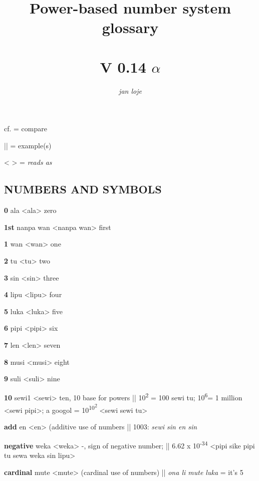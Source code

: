 \documentclass{article}
\title{Power-based number system glossary \\[1ex]{\HHUGE{\tpf lipu-nimi pi nasin nanpa sewi1}} \\ V 0.14 $\alpha$}
\author{\textit{jan loje}}
\begin{document}
\maketitle

\newcommand\tpDef[4]{\textbf{#1} {\Large\tpf #2} <\textsf{#3}> #4}

\newcommand\tpDefB[3]{\textbf{#1} {\Large\tpf #2} \textit{#3}}

\setlength{\parskip}{0.3em}

cf. = compare

|| = example(s)

< > = \textit{reads as}



\begin{multicols}{2}
\raggedright
\begin{hangparas}{1cm}{1}

\section*{NUMBERS AND SYMBOLS}

\tpDef {0}{ala}{ala}{zero}

\tpDef {1st}{nanpa wan}{nanpa wan}{first}

\tpDef {1}{wan}{wan}{one}

\tpDef {2}{tu}{tu}{two}

\tpDef {3}{sin}{sin}{three}

\tpDef {4}{lipu}{lipu}{four}

\tpDef {5}{luka}{luka}{five}

\tpDef {6}{pipi}{pipi}{six}

\tpDef {7}{len}{len}{seven}

\tpDef {8}{musi}{musi}{eight}

\tpDef {9}{suli}{suli}{nine}

\tpDef {10}{sewi1}{sewi}{ten, 10 base for powers || 10\textsuperscript{2} = 100 \textsf{sewi tu};  10\textsuperscript{6}= 1 million \textsf{<sewi pipi>}; a googol = 10\textsuperscript{10\textsuperscript{2}} \textsf{<sewi sewi tu>}}

\tpDef {add}{en}{en}{(additive use of numbers || 1003:\textit{ sewi sin en sin}}

\tpDef {negative}{weka}{weka}{-, sign of negative number; ||  6.62 x 10\textsuperscript{-34} \textsf{<pipi sike pipi tu sewa weka sin lipu>} }

\tpDef {cardinal}{mute}{mute}{(cardinal use of numbers) || \textit{ona li mute luka} = it's 5}


\end{hangparas}
\end{multicols}
\end{document}
